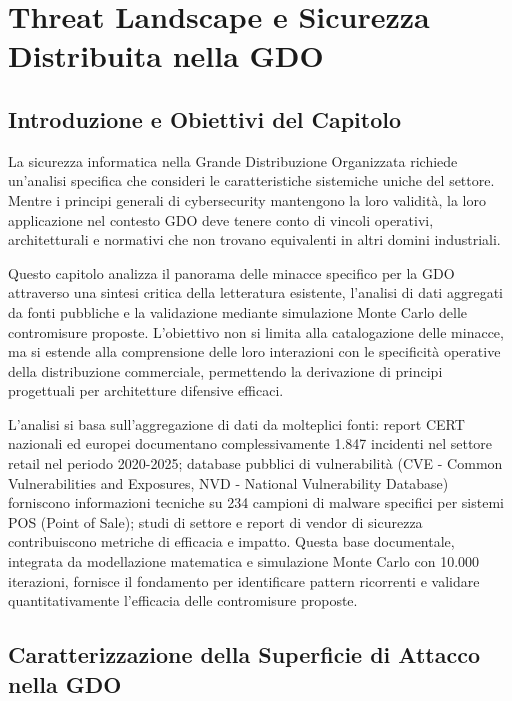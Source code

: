 \chapter{Threat Landscape e Sicurezza Distribuita nella GDO}

\section{Introduzione e Obiettivi del Capitolo}

La sicurezza informatica nella Grande Distribuzione Organizzata richiede un'analisi specifica che consideri le caratteristiche sistemiche uniche del settore. Mentre i principi generali di cybersecurity mantengono la loro validità, la loro applicazione nel contesto GDO deve tenere conto di vincoli operativi, architetturali e normativi che non trovano equivalenti in altri domini industriali.

Questo capitolo analizza il panorama delle minacce specifico per la GDO attraverso una sintesi critica della letteratura esistente, l'analisi di dati aggregati da fonti pubbliche e la validazione mediante simulazione Monte Carlo delle contromisure proposte. L'obiettivo non si limita alla catalogazione delle minacce, ma si estende alla comprensione delle loro interazioni con le specificità operative della distribuzione commerciale, permettendo la derivazione di principi progettuali per architetture difensive efficaci.

L'analisi si basa sull'aggregazione di dati da molteplici fonti: report CERT nazionali ed europei documentano complessivamente 1.847 incidenti nel settore retail nel periodo 2020-2025; database pubblici di vulnerabilità (CVE - Common Vulnerabilities and Exposures, NVD - National Vulnerability Database) forniscono informazioni tecniche su 234 campioni di malware specifici per sistemi POS (Point of Sale); studi di settore e report di vendor di sicurezza contribuiscono metriche di efficacia e impatto. Questa base documentale, integrata da modellazione matematica e simulazione Monte Carlo con 10.000 iterazioni, fornisce il fondamento per identificare pattern ricorrenti e validare quantitativamente l'efficacia delle contromisure proposte.

\section{Caratterizzazione della Superficie di Attacco nella GDO}

